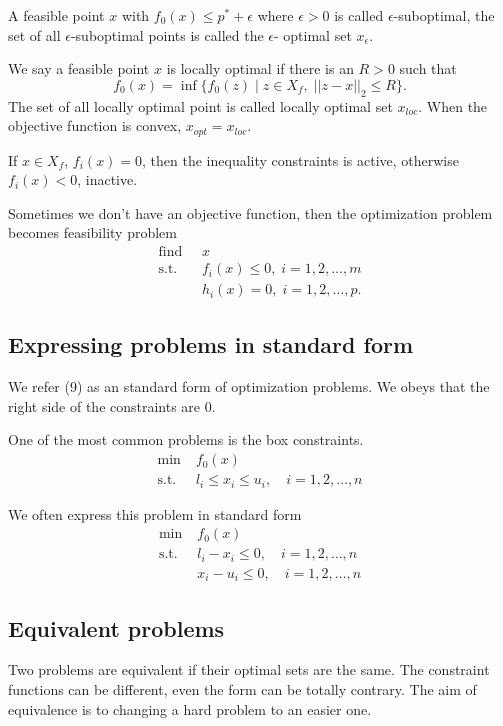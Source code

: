 \documentclass[lang=en,color=blue,mode=fancy,titlestyle=hang]{elegantbook}
\begin{document}
A feasible point $x$ with $f_0(x) \leq p^* + \epsilon$ where $\epsilon > 0$ is called
$\epsilon$-suboptimal, the set of all $\epsilon$-suboptimal points is called the $\epsilon$-
optimal set $x_{\epsilon}$.

We say a feasible point $x$ is locally optimal if there is an $R > 0$ such that
\[
f_0(x) = \inf \{ f_0(z) \;|\; z \in X_f, \; ||z - x||_2 \leq R \}.
\]
The set of all locally optimal point is called locally optimal set $x_{loc}$. When the
objective function is convex, $x_{opt} = x_{loc}$.

If $x \in X_f$, $f_i(x) = 0$, then the inequality constraints is active, otherwise
$f_i(x) < 0$, inactive.

Sometimes we don't have an objective function, then the optimization problem becomes
feasibility problem
\begin{align*}
  \text{find } \; &x \\
  \text{s.t. }\; &f_i(x) \leq 0, \; i = 1, 2, \ldots, m \\
  &h_i(x) = 0, \; i = 1, 2, \ldots, p.
\end{align*}

\subsection{Expressing problems in standard form}
We refer (9) as an standard form of optimization problems. We obeys that the right side
of the constraints are 0.

One of the most common problems is the box constraints.
\begin{align*}
  \min \; &f_0(x) \\
  \text{s.t.}\; &l_i \leq x_i \leq u_i,\quad i = 1,2,\ldots,n
\end{align*}

We often express this problem in standard form
\begin{align*}
  \min \; &f_0(x) \\
  \text{s.t.}\; &l_i - x_i \leq 0,\quad i = 1,2,\ldots,n \\
  &x_i - u_i \leq 0,\quad i = 1,2,\ldots,n
\end{align*}

\subsection{Equivalent problems}
Two problems are equivalent if their optimal sets are the same. The constraint functions
can be different, even the form can be totally contrary. The aim of equivalence is to
changing a hard problem to an easier one.
\end{document}
